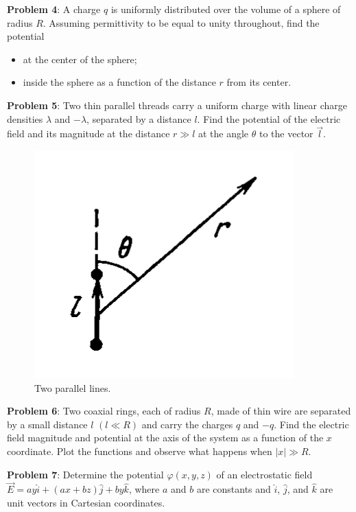 \documentclass[11pt, letterpaper]{article}
\begin{document}
	\textbf{Problem 4}: A charge $q$ is uniformly distributed over the volume of a sphere of 
	radius $R$. Assuming permittivity to be equal to unity throughout, find the potential
	\begin{itemize}
		\item at the center of the sphere;
		\item inside the sphere as a function of the distance $r$ from its center.
	\end{itemize}
		
	\pagebreak
	\textbf{Problem 5}: Two thin parallel threads carry a uniform charge with linear charge 
	densities $\lambda$ and $-\lambda$, separated by a distance $l$. Find the potential of
	the electric field and its magnitude at the distance $r \gg l$ at the angle $\theta$ to the 
	vector $\vec{l}$.
	\begin{figure}[h!]
		\centering
		\includegraphics[scale=0.5]{two-lines}
		\caption{Two parallel lines.}
	\end{figure}
	
	\textbf{Problem 6}: Two coaxial rings, each of radius $R$, made of thin wire are separated
	by a small distance $l$ $(l \ll R)$ and carry the charges $q$ and $-q$. Find the electric 
	field magnitude and potential at the axis of the system as a function of the $x$ coordinate.  
	Plot the functions and observe what happens when $|x| \gg R$. 

	\textbf{Problem 7}: Determine the potential $\varphi(x,y,z)$ of an electrostatic field 
	$\vec{E} = ay\hat{i} +(ax+bz)\hat{j} + by\hat{k}$, where $a$ and $b$ are constants
	and $\hat{i}$, $\hat{j}$, and $\hat{k}$ are unit vectors in Cartesian coordinates.
	
		
	
	
		
\end{document}
